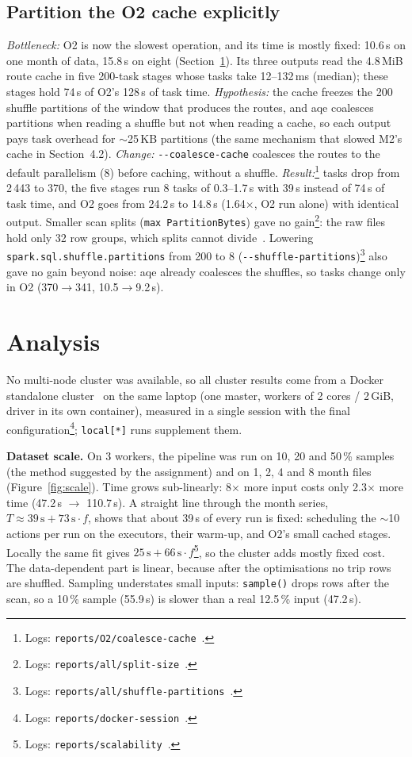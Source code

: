 \documentclass[sigconf]{acmart}
\newcommand{\src}[1]{\footnote{Logs: \texttt{reports/#1}~\cite{repo}.}}
\begin{document}
\subsection{Partition the O2 cache explicitly}
\label{sec:coalesce} \emph{Bottleneck:} O2 is now the slowest operation, and its
time is mostly fixed: 10.6\,s on one month of data, 15.8\,s on eight (Section~\ref{sec:analysis}).
Its three outputs read the 4.8\,MiB route cache in five 200-task stages whose
tasks take 12--132\,ms (median); these stages hold 74\,s of O2's 128\,s of
task time. \emph{Hypothesis:} the cache freezes the 200 shuffle partitions of
the window that produces the routes, and \gls{aqe} coalesces partitions when
reading a shuffle but not when reading a cache, so each output pays task overhead
for $\sim$25\,KB partitions (the same mechanism that slowed M2's cache in Section~4.2).
\emph{Change:} \texttt{-{}-coalesce-cache} coalesces the routes to the default
parallelism (8) before caching, without a shuffle. \emph{Result:}\src{O2/coalesce-cache} tasks drop
from 2\,443 to 370, the five stages run 8 tasks of 0.3--1.7\,s with 39\,s
instead of 74\,s of task time, and O2 goes from 24.2\,s to 14.8\,s (1.64$\times$,
O2 run alone) with identical output. Smaller scan splits (\texttt{max\allowbreak
      Partition\allowbreak Bytes}) gave no gain\src{all/split-size}: the raw files hold only 32 row
groups, which splits cannot divide~\cite{parquet-format,spark-parquet}.
Lowering \texttt{spark.sql.shuffle.partitions} from 200 to 8
(\texttt{-{}-shuffle-partitions})\src{all/shuffle-partitions} also gave no
gain beyond noise: \gls{aqe} already coalesces the shuffles, so tasks change
only in O2 (370$\to$341, 10.5$\to$9.2\,s).

\section{Analysis}
\label{sec:analysis}

No multi-node cluster was available, so all cluster results come from a Docker
standalone cluster~\cite{spark-standalone} on the same laptop (one master,
workers of 2 cores / 2\,GiB, driver in its own container), measured in a single
session with the final configuration\src{docker-session}; \texttt{local[*]}
runs supplement them.

\textbf{Dataset scale.} On 3 workers, the pipeline was run on 10, 20 and 50\,\%
samples (the method suggested by the assignment) and on 1, 2, 4 and 8 month
files (Figure~\ref{fig:scale}). Time grows sub-linearly: 8$\times$ more input
costs only 2.3$\times$ more time (47.2\,s $\to$ 110.7\,s). A straight line
through the month series, $T \approx 39\,\mathrm{s}+ 73\,\mathrm{s}\cdot f$,
shows that about 39\,s of every run is fixed: scheduling the $\sim$10 actions
per run on the executors, their warm-up, and O2's small cached stages. Locally
the same fit gives $25\,\mathrm{s}+66\,\mathrm{s}\cdot f$\src{scalability}, so the cluster adds
mostly fixed cost. The data-dependent part is linear, because after the
optimisations no trip rows are shuffled. Sampling understates small inputs:
\texttt{sample()} drops rows after the scan, so a 10\,\% sample (55.9\,s) is
slower than a real 12.5\,\% input (47.2\,s).
\end{document}
